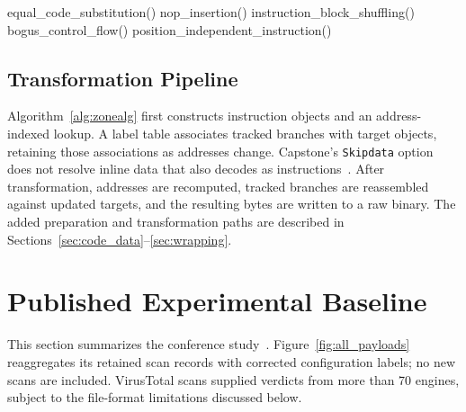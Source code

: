 \documentclass[runningheads]{llncs}
\begin{document}
\begin{algorithm}[t]
\BlankLine

 {
    equal\_code\_substitution()\;
    nop\_insertion()\;
    instruction\_block\_shuffling()\;
    bogus\_control\_flow()\;
    position\_independent\_instruction()\;
}

\BlankLine


\BlankLine


\end{algorithm}

\subsection{Transformation Pipeline}
Algorithm~\ref{alg:zonealg} first constructs instruction objects and an
address-indexed lookup. A label table associates tracked branches with
target objects, retaining those associations as addresses change.
Capstone's \texttt{Skipdata} option does not resolve inline data that also
decodes as instructions~\cite{bin2binobf}. After transformation, addresses
are recomputed, tracked branches are reassembled against updated targets,
and the resulting bytes are written to a raw binary. The added preparation
and transformation paths are described in
Sections~\ref{sec:code_data}--\ref{sec:wrapping}.

\section{Published Experimental Baseline}\label{sec:results}


This section summarizes the conference study~\cite{zone_secrypt_2026}.
Figure~\ref{fig:all_payloads} reaggregates its retained scan records with
corrected configuration labels; no new scans are included. VirusTotal scans supplied verdicts from more than 70 engines, subject to the file-format limitations discussed below.
\end{document}
